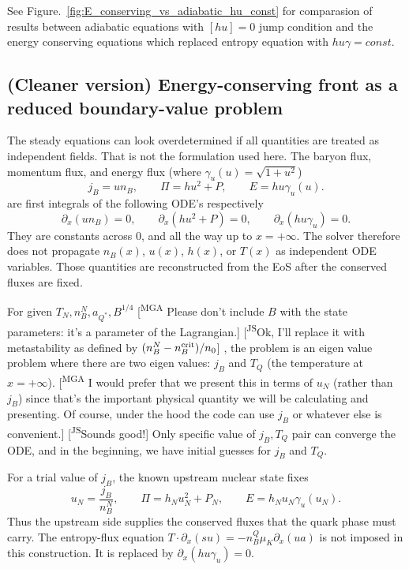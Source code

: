 \documentclass[11pt]{article}
\newcommand{\mgacom}[1]{\textsf{\color[rgb]{0.75,0,0}[\textsuperscript{MGA} #1]}}
\newcommand{\JS}[1]{{\color{violet}#1}}
\newcommand{\JScom}[1]{\textsf{\color{violet} [\textsuperscript{JS}#1]}}
\begin{document}
See Figure.~\ref{fig:E_conserving_vs_adiabatic_hu_const} for comparasion of results between adiabatic equations with $[hu]=0$ jump condition and the energy conserving equations which replaced entropy equation with $hu\gamma = const.$

\iffalse
\JS{
\subsection{(Cleaner version) Energy-conserving front as a reduced boundary-value problem}

The steady equations can look overdetermined if all quantities are treated as
independent fields.  That is not the formulation used here.  The baryon flux,
momentum flux, and energy flux  (where $\gamma_u(u) = \sqrt{1+u^2}$)
\begin{equation}
j_B = u n_B,
\qquad
\Pi = h u^2 + P,
\qquad
E = h u\gamma_u(u).
\end{equation}
are first integrals of the following ODE's respectively
\begin{equation}
\partial_x(u n_B) = 0,
\qquad
\partial_x(h u^2 + P) = 0,
\qquad
\partial_x(h u\gamma_u) = 0.
\end{equation}
They are constants across $0$, and all the way up to $x=+\infty$.  The solver therefore does not
propagate \(n_B(x)\), \(u(x)\), \(h(x)\), or \(T(x)\) as independent ODE
variables.  Those quantities are reconstructed from the EoS after the conserved
fluxes are fixed.

For given $T_N, n_B^N, a_{Q^\ast}, B^{1/4}$ \mgacom{Please don't include $B$ with the  state parameters: it's a parameter of the Lagrangian.}\JScom{Ok, I'll replace it with metastability as defined by $(n_B^N - n_B^{\rm crit})/n_0$} , the problem is an eigen value problem where there are two eigen values: $j_B$ and $T_Q$ (the temperature at $x=+\infty$).
\mgacom{I would prefer that we present this in terms of $u_N$ (rather than $j_B$) since that's the important physical quantity we will be calculating and presenting. Of course, under the hood the code can use $j_B$ or whatever else is convenient.}\JScom{Sounds good!}
Only specific value of $j_B, T_Q$ pair can converge the ODE, and in the beginning, we have initial guesses for $j_B $ and $T_Q$. 

For a trial value of \(j_B\), the known upstream nuclear state fixes
\begin{equation}
u_N=\frac{j_B}{n_B^N},
\qquad
\Pi=h_Nu_N^2+P_N,
\qquad
E=h_Nu_N\gamma_u(u_N).
\end{equation}
Thus the upstream side supplies the conserved fluxes that the quark phase must
carry.  The entropy-flux equation $T\cdot\partial_x(su) = -n_B^Q\mu_K\partial_x(ua)$ is not imposed in this construction.  It is
replaced by $\partial_x(hu\gamma_u)=0$.

}
\end{document}
